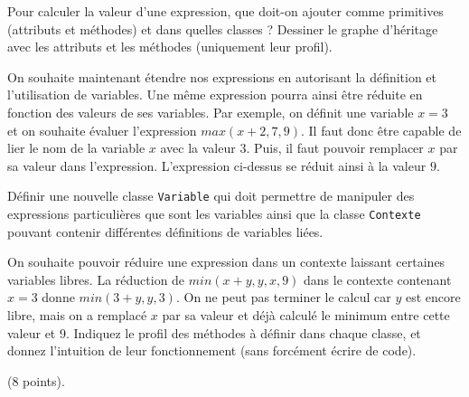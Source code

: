 \documentclass[a4paper,10pt]{article}
\begin{document}
\begin{Question}
  Pour calculer la valeur d'une expression, que doit-on ajouter comme
  primitives (attributs et méthodes) et dans quelles classes ?
  Dessiner le graphe d'héritage avec les attributs et les méthodes
  (uniquement leur profil).
\end{Question}


On souhaite maintenant étendre nos expressions en autorisant la
définition et l'utilisation de variables. Une même expression pourra
ainsi être réduite en fonction des valeurs de ses variables.  Par
exemple, on définit une variable $x = 3$ et on souhaite évaluer
l'expression $ max(x+2, 7, 9)$.  Il faut donc être capable de lier le
nom de la variable $x$ avec la valeur $3$. Puis, il faut pouvoir
remplacer $x$ par sa valeur dans l'expression. L'expression ci-dessus
se réduit ainsi à la valeur $9$.

\Question Définir une nouvelle classe \texttt{Variable} qui doit
permettre de manipuler des expressions particulières que sont les
variables ainsi que la classe \texttt{Contexte} pouvant contenir
différentes définitions de variables liées.


\Question On souhaite pouvoir réduire une expression dans un contexte
laissant certaines variables libres. La réduction de
$min(x+y, y, x, 9)$ dans le contexte contenant $x=3$ donne
$min(3+y, y, 3)$. On ne peut pas terminer le calcul car $y$ est encore
libre, mais on a remplacé $x$ par sa valeur et déjà calculé le minimum
entre cette valeur et 9. Indiquez le profil des méthodes à définir
dans chaque classe, et donnez l'intuition de leur fonctionnement (sans
forcément écrire de code).

\bigskip
{} (8 points).

\end{document}
